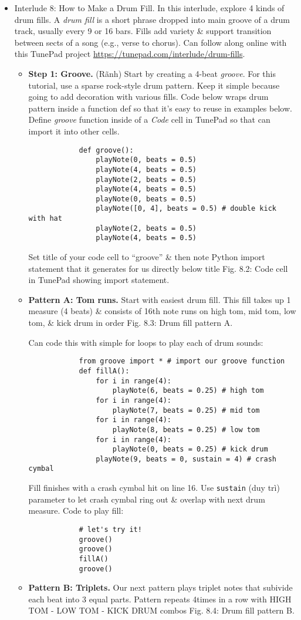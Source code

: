 \documentclass{article}
\begin{document}
\begin{itemize}
	\item {\sf Interlude 8: How to Make a Drum Fill.} In this interlude, explore 4 kinds of drum fills. A {\it drum fill} is a short phrase dropped into main groove of a drum track, usually every 9 or 16 bars. Fills add variety \& support transition between sects of a song (e.g., verse to chorus). Can follow along online with this TunePad project \url{https://tunepad.com/interlude/drum-fills}.
	\begin{itemize}
		\item {\bf Step 1: Groove.} (Rãnh) Start by creating a 4-beat {\it groove}. For this tutorial, use a sparse rock-style drum pattern. Keep it simple because going to add decoration with various fills. Code below wraps drum pattern inside a function def so that it's easy to reuse in examples below. Define {\it groove} function inside of a {\it Code} cell in TunePad so that can import it into other cells.
		\begin{verbatim}
			def groove():
			    playNote(0, beats = 0.5)
			    playNote(4, beats = 0.5)
			    playNote(2, beats = 0.5)
			    playNote(4, beats = 0.5)
			    playNote(0, beats = 0.5)
			    playNote([0, 4], beats = 0.5) # double kick with hat
			    playNote(2, beats = 0.5)
			    playNote(4, beats = 0.5)
		\end{verbatim}
		Set title of your code cell to ``groove'' \& then note Python import statement that it generates for us directly below title {\sf Fig. 8.2: Code cell in TunePad showing import statement}.
		\item {\bf Pattern A: Tom runs.} Start with easiest drum fill. This fill takes up 1 measure (4 beats) \& consists of 16th note runs on high tom, mid tom, low tom, \& kick drum in order {\sf Fig. 8.3: Drum fill pattern A}.
		
		Can code this with simple for loops to play each of drum sounds:
		\begin{verbatim}
			from groove import * # import our groove function
			def fillA():
			    for i in range(4):
			        playNote(6, beats = 0.25) # high tom
			    for i in range(4):
			        playNote(7, beats = 0.25) # mid tom
			    for i in range(4):
			        playNote(8, beats = 0.25) # low tom
			    for i in range(4):
			        playNote(0, beats = 0.25) # kick drum
			    playNote(9, beats = 0, sustain = 4) # crash cymbal
		\end{verbatim}
		Fill finishes with a crash cymbal hit on line 16. Use {\tt sustain} (duy trì) parameter to let crash cymbal ring out \& overlap with next drum measure. Code to play fill:
		\begin{verbatim}
			# let's try it!
			groove()
			groove()
			fillA()
			groove()
		\end{verbatim}
		\item {\bf Pattern B: Triplets.} Our next pattern plays triplet notes that subivide each beat into 3 equal parts. Pattern repeats 4times in a row with HIGH TOM - LOW TOM - KICK DRUM combos {\sf Fig. 8.4: Drum fill pattern B}.
		

\end{itemize}
\end{itemize}
\end{document}
